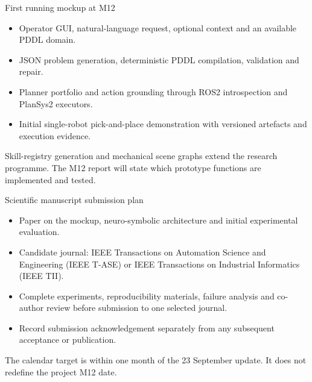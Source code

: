 \documentclass[aspectratio=169,11pt]{beamer}
\begin{document}
\begin{frame}{First running mockup at M12}
\begin{itemize}\items
\item Operator GUI, natural-language request, optional context and an available PDDL domain.
\item JSON problem generation, deterministic PDDL compilation, validation and repair.
\item Planner portfolio and action grounding through ROS2 introspection and PlanSys2 executors.
\item Initial single-robot pick-and-place demonstration with versioned artefacts and execution evidence.
\end{itemize}
\small Skill-registry generation and mechanical scene graphs extend the research programme. The M12 report will state which prototype functions are implemented and tested.
\end{frame}

\begin{frame}{Scientific manuscript submission plan}
\begin{itemize}\items
\item Paper on the mockup, neuro-symbolic architecture and initial experimental evaluation.
\item Candidate journal: IEEE Transactions on Automation Science and Engineering (IEEE T-ASE) or IEEE Transactions on Industrial Informatics (IEEE TII).
\item Complete experiments, reproducibility materials, failure analysis and co-author review before submission to one selected journal.
\item Record submission acknowledgement separately from any subsequent acceptance or publication.
\end{itemize}
\small The calendar target is within one month of the 23 September update. It does not redefine the project M12 date.
\end{frame}
\end{document}
